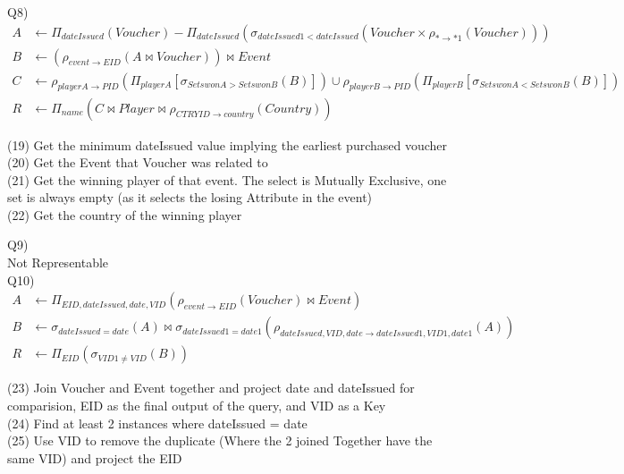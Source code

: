 \documentclass[12pt] {article}
\begin{document}
        Q8)
        \begin{align}
            A &\leftarrow \Pi_{dateIssued}(Voucher) - \Pi_{dateIssued}(\sigma_{dateIssued1<dateIssued}(Voucher \times \rho_{* \rightarrow *1}(Voucher)))\\
    		B &\leftarrow (\rho_{event \rightarrow EID}(A \bowtie Voucher)) \bowtie Event\\
    		C &\leftarrow \rho_{playerA \rightarrow PID}(\Pi_{playerA}[\sigma_{SetswonA > SetswonB}(B)]) \cup 
    		\rho_{playerB \rightarrow PID}(\Pi_{playerB}[\sigma_{SetswonA < SetswonB}(B)])\\
    		R &\leftarrow \Pi_{name}(C \bowtie Player \bowtie \rho_{CTRYID \rightarrow country}(Country))
        \end{align}
        \begin{flushleft}
        (19) Get the minimum dateIssued value implying the earliest purchased voucher\\
        (20) Get the Event that Voucher was related to\\
        (21) Get the winning player of that event. The select is Mutually Exclusive, one set is always empty (as it selects the losing Attribute in the event)\\
        (22) Get the country of the winning player
        \end{flushleft}

        Q9) \\

        	Not Representable\\
        
        Q10)
        \begin{align}
        	A &\leftarrow \Pi_{EID, dateIssued, date, VID}(\rho_{event \rightarrow EID}(Voucher) \bowtie Event)\\
        	B &\leftarrow   \sigma_{dateIssued = date}(A) \bowtie \sigma_{dateIssued1 = date1}(\rho_{dateIssued, VID, date \rightarrow dateIssued1, VID1, date1}(A))\\
        	R &\leftarrow \Pi_{EID}(\sigma_{VID1 \neq VID}(B))
        \end{align}
        \begin{flushleft}
        (23) Join Voucher and Event together and project date and dateIssued for comparision, EID as the final output of the query, and VID as a Key \\
        (24) Find at least 2 instances where dateIssued = date \\
        (25) Use VID to remove the duplicate (Where the 2 joined Together have the same VID) and project the EID
        \end{flushleft}
\end{document}
